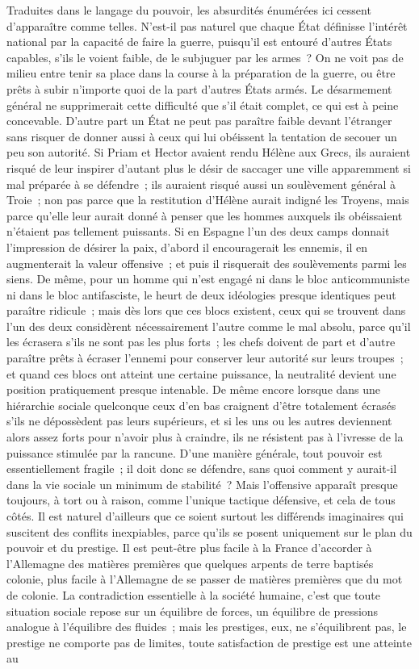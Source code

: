 \documentclass[french,twoside]{book} %
\begin{document}
Traduites dans le langage du pouvoir, les absurdités énumérées ici cessent d'apparaître comme telles. N'est-il pas naturel que chaque État définisse l'intérêt national par la capacité de faire la guerre, puisqu'il est entouré d'autres États capables, s'ils le voient faible, de le subjuguer par les armes ? On ne voit pas de milieu entre tenir sa place dans la course à la préparation de la guerre, ou être prêts à subir n'importe quoi de la part d'autres États armés. Le désarmement général ne supprimerait cette difficulté que s'il était complet, ce qui est à peine concevable. D'autre part un État ne peut pas paraître faible devant l'étranger sans risquer de donner aussi à ceux qui lui obéissent la tentation de secouer un peu son autorité. Si Priam et Hector avaient rendu Hélène aux Grecs, ils auraient risqué de leur inspirer d'autant plus le désir de saccager une ville apparemment si mal préparée à se défendre ; ils auraient risqué aussi un soulèvement général à Troie ; non pas parce que la restitution d'Hélène aurait indigné les Troyens, mais parce qu'elle leur aurait donné à penser que les hommes auxquels ils obéissaient n'étaient pas tellement puissants. Si en Espagne l'un des deux camps donnait l'impression de désirer la paix, d'abord il encouragerait les ennemis, il en augmenterait la valeur offensive ; et puis il risquerait des soulèvements parmi les siens. De même, pour un homme qui n'est engagé ni dans le bloc anticommuniste ni dans le bloc antifasciste, le heurt de deux idéologies presque identiques peut paraître ridicule ; mais dès lors que ces blocs existent, ceux qui se trouvent dans l'un des deux considèrent nécessairement l'autre comme le mal absolu, parce qu'il les écrasera s'ils ne sont pas les plus forts ; les chefs doivent de part et d'autre paraître prêts à écraser l'ennemi pour conserver leur autorité sur leurs troupes ; et quand ces blocs ont atteint une certaine puissance, la neutralité devient une position pratiquement presque intenable. De même encore lorsque dans une hiérarchie sociale quelconque ceux d'en bas craignent d'être totalement écrasés s'ils ne dépossèdent pas leurs supérieurs, et si les uns ou les autres deviennent alors assez forts pour n'avoir plus à craindre, ils ne résistent pas à l'ivresse de la puissance stimulée par la rancune. D'une manière générale, tout pouvoir est essentiellement fragile ; il doit donc se défendre, sans quoi comment y aurait-il dans la vie sociale un minimum de stabilité ? Mais l'offensive apparaît pres­que toujours, à tort ou à raison, comme l'unique tactique défensive, et cela de tous côtés. Il est naturel d'ailleurs que ce soient surtout les différends imagi­naires qui suscitent des conflits inexpiables, parce qu'ils se posent uniquement sur le plan du pouvoir et du prestige. Il est peut-être plus facile à la France d'accorder à l'Allemagne des matières premières que quelques arpents de terre baptisés colonie, plus facile à l'Allemagne de se passer de matières premières que du mot de colonie. La contradiction essentielle à la société humaine, c'est que toute situation sociale repose sur un équilibre de forces, un équilibre de pressions analogue à l'équilibre des fluides ; mais les prestiges, eux, ne s'équilibrent pas, le prestige ne comporte pas de limites, toute satisfaction de prestige est une atteinte au 
\end{document}
